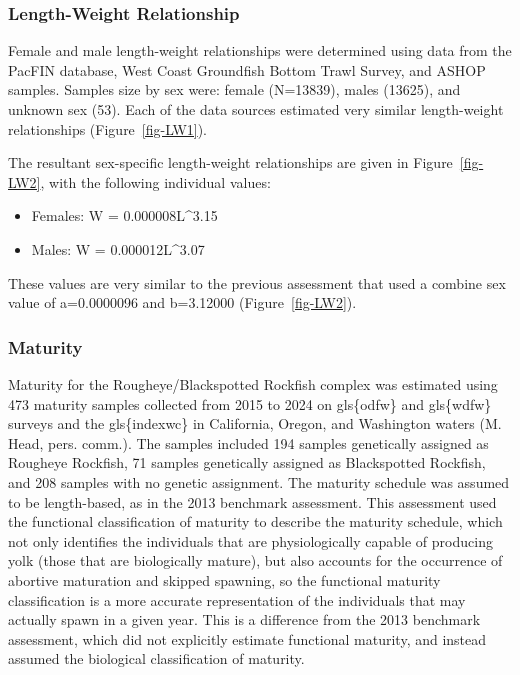 \documentclass[
]{scrartcl}
\providecommand{\tightlist}{%
  \setlength{\itemsep}{0pt}\setlength{\parskip}{0pt}}\usepackage{longtable,booktabs,array}
\begin{document}
\subsubsection{Length-Weight
Relationship}\label{length-weight-relationship}

Female and male length-weight relationships were determined using data
from the PacFIN database, West Coast Groundfish Bottom Trawl Survey, and
ASHOP samples. Samples size by sex were: female (N=13839), males
(13625), and unknown sex (53). Each of the data sources estimated very
similar length-weight relationships (Figure~\ref{fig-LW1}).

The resultant sex-specific length-weight relationships are given in
Figure~\ref{fig-LW2}, with the following individual values:

\begin{itemize}
\tightlist
\item
  Females: W = 0.000008L\^{}3.15
\item
  Males: W = 0.000012L\^{}3.07
\end{itemize}

These values are very similar to the previous assessment that used a
combine sex value of a=0.0000096 and b=3.12000 (Figure~\ref{fig-LW2}).

\subsubsection{Maturity}\label{maturity}

Maturity for the Rougheye/Blackspotted Rockfish complex was estimated
using 473 maturity samples collected from 2015 to 2024 on gls\{odfw\}
and gls\{wdfw\} surveys and the gls\{indexwc\} in California, Oregon,
and Washington waters (M. Head, pers. comm.). The samples included 194
samples genetically assigned as Rougheye Rockfish, 71 samples
genetically assigned as Blackspotted Rockfish, and 208 samples with no
genetic assignment. The maturity schedule was assumed to be
length-based, as in the 2013 benchmark assessment. This assessment used
the functional classification of maturity to describe the maturity
schedule, which not only identifies the individuals that are
physiologically capable of producing yolk (those that are biologically
mature), but also accounts for the occurrence of abortive maturation and
skipped spawning, so the functional maturity classification is a more
accurate representation of the individuals that may actually spawn in a
given year. This is a difference from the 2013 benchmark assessment,
which did not explicitly estimate functional maturity, and instead
assumed the biological classification of maturity.
\end{document}
